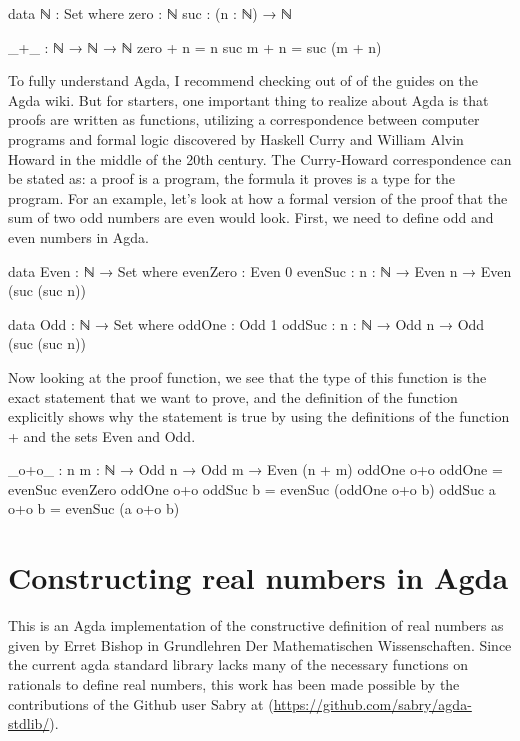 \documentclass[11pt,a4paper]{article}
\begin{document}
\begin{code}
data ℕ : Set where
  zero : ℕ
  suc  : (n : ℕ) → ℕ

_+_ : ℕ → ℕ → ℕ
zero  + n = n
suc m + n = suc (m + n)
\end{code}

To fully understand Agda, I recommend checking out of of the guides on the Agda wiki. But for starters, one important thing to realize about Agda is that proofs are written as functions, utilizing a correspondence between computer programs and formal logic discovered by Haskell Curry and William Alvin Howard in the middle of the 20th century. The Curry-Howard correspondence can be stated as: a proof is a program, the formula it proves is a type for the program. For an example, let's look at how a formal version of the  proof that the sum of two odd numbers are even would look. First, we need to define odd and even numbers in Agda.

\begin{code}
data Even : ℕ → Set where
  evenZero : Even 0
  evenSuc : {n : ℕ} → Even n → Even (suc (suc n))
 
data Odd : ℕ → Set where
  oddOne : Odd 1
  oddSuc : {n : ℕ} → Odd n → Odd (suc (suc n))
\end{code}

Now looking at the proof function, we see that the type of this function is the exact statement that we want to prove, and the definition of the function explicitly shows why the statement is true by using the definitions of the function + and the sets Even and Odd.
\begin{code}
_o+o_ : {n m : ℕ} → Odd n → Odd m → Even (n + m)
oddOne o+o oddOne = evenSuc evenZero
oddOne o+o oddSuc b = evenSuc (oddOne o+o b)
oddSuc a o+o b = evenSuc (a o+o b)
\end{code}

\section{Constructing real numbers in Agda}\label{sec: reals in agda}

This is an Agda implementation of the constructive definition of real numbers as given by Erret Bishop in Grundlehren Der Mathematischen Wissenschaften. Since the current agda standard library lacks many of the necessary functions on rationals to define real numbers, this work has been made possible by the contributions of the Github user Sabry at (\url{https://github.com/sabry/agda-stdlib/}).\\
\end{document}
